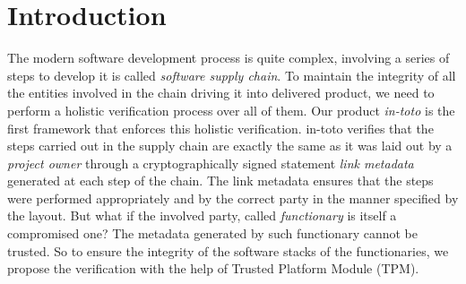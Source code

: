 
\section{Introduction}
The modern software development process is quite complex, involving a series of steps to develop it is called \textit{software supply chain}. To maintain the integrity of all the entities involved in the chain driving it into delivered product, we need to perform a holistic verification process over all of them. Our product \textit{in-toto} is the first framework that enforces this holistic verification. in-toto verifies that the steps carried out in the supply chain are exactly the same as it was laid out by a \textit{project owner} through a cryptographically signed statement \textit{link metadata} generated at each step of the chain. The link metadata ensures that the steps were performed appropriately and by the correct party in the manner specified by the layout. But what if the involved party, called \textit{functionary} is itself a compromised one? The metadata generated by such functionary cannot be trusted. So to ensure the integrity of the software stacks of the functionaries, we propose the verification with the help of Trusted Platform Module (TPM).

